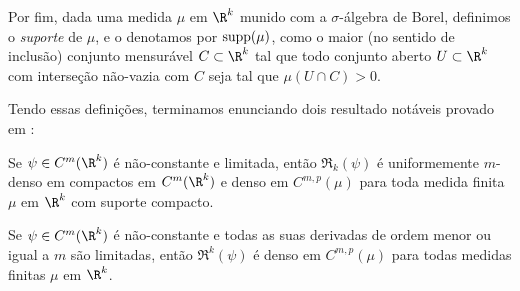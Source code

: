 Por fim, dada uma medida \( \mu \) em \( \R^{ k } \) munido com a \( \sigma \)-álgebra de Borel, definimos o \emph{suporte} de \( \mu  \), e o denotamos por \( \operatorname{supp} (\mu) \), como o maior (no sentido de inclusão) conjunto mensurável \( C \subset \R^{ k } \) tal que todo conjunto aberto \( U \subset \R^{ k } \) com interseção não-vazia com \( C \) seja tal que \( \mu (U \cap C ) > 0 \).

Tendo essas definições, terminamos enunciando dois resultado notáveis provado em \cite{hornik91}:

\begin{teo}
    Se \( \psi \in C^{ m }(\R^{ k }) \) é não-constante e limitada, então \( \mathfrak{R}_{ k }(\psi) \) é uniformemente \( m \)-denso em compactos em \( C^{ m }(\R^{ k }) \) e denso em \( C^{ m, p }(\mu) \) para toda medida finita \( \mu \) em \( \R^{ k } \) com suporte compacto.
\end{teo}

\begin{teo}
    Se \( \psi \in C^{ m }(\R^{ k }) \) é não-constante e todas as suas derivadas de ordem menor ou igual a \( m \) são limitadas, então \( \mathfrak{R}^{ k }(\psi) \) é denso em \( C^{ m, p }(\mu) \) para todas medidas finitas \( \mu \) em \( \R^{ k } \).
\end{teo}



